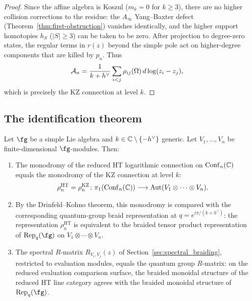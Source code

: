 \begin{proof}
Since the affine algebra is Koszul ($m_k = 0$ for $k \geq 3$), there are no higher collision corrections to the residue: the $A_\infty$ Yang--Baxter defect (Theorem~\ref{thm:first-obstruction}) vanishes identically, and the higher support homotopies $h_S$ ($|S| \geq 3$) can be taken to be zero. After projection to degree-zero states, the regular terms in $r(z)$ beyond the simple pole act on higher-degree components that are killed by $p_n$. Thus
\[
 \mathcal A_n = \frac{1}{k + h^\vee}\sum_{i < j} \rho_{ij}(\Omega)\, d\log(z_i - z_j),
\]
which is precisely the KZ connection at level $k$.
\end{proof}

\subsection{The identification theorem}

\begin{theorem}
\label{thm:affine-monodromy-identification}
Let $\fg$ be a simple Lie algebra and $k \in \mathbb C \setminus \{-h^\vee\}$ generic. Let $V_1, \dots, V_n$ be finite-dimensional $\fg$-modules. Then:
\begin{enumerate}[label=\textup{(\roman*)}]
 \item The monodromy of the reduced HT logarithmic connection on $\mathrm{Conf}_n(\mathbb C)$ equals the monodromy of the KZ connection at level $k$:
 \[
 \rho_n^{\mathrm{HT}} = \rho_n^{\mathrm{KZ}} \colon \pi_1(\mathrm{Conf}_n(\mathbb C)) \longrightarrow \mathrm{Aut}(V_1 \otimes \cdots \otimes V_n).
 \]
 \item By the Drinfeld--Kohno theorem, this monodromy is compared with the corresponding quantum-group braid representation at $q = e^{i\pi/(k + h^\vee)}$: the representation $\rho_n^{\mathrm{HT}}$ is equivalent to the braided tensor product representation of\/ $\mathrm{Rep}_q(\fg)$ on $V_1 \otimes \cdots \otimes V_n$.
 \item The spectral $R$-matrix $R_{V_i, V_j}(z)$ of Section~\textup{\ref{sec:spectral_braiding}}, restricted to evaluation modules, equals the quantum group $R$-matrix: on the reduced evaluation comparison surface, the braided monoidal structure of the reduced HT line category agrees with the braided monoidal structure of $\mathrm{Rep}_q(\fg)$.
\end{enumerate}
\end{theorem}

